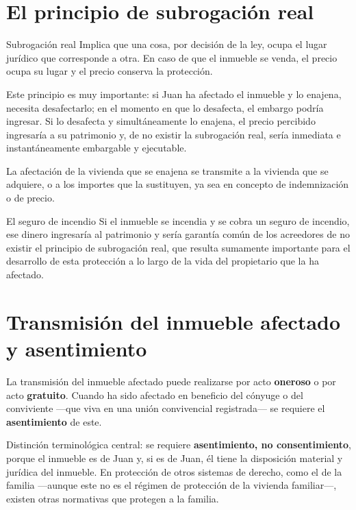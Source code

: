 \documentclass[12pt,oneside]{book}
\begin{document}
\section{El principio de subrogaci\'on real}

\begin{definition}{Subrogaci\'on real}
Implica que una cosa, por decisi\'on de la ley, ocupa el lugar jur\'idico que corresponde a otra. En caso de que el inmueble se venda, el precio ocupa su lugar y el precio conserva la protecci\'on.
\end{definition}

Este principio es muy importante: si Juan ha afectado el inmueble y lo enajena, necesita desafectarlo; en el momento en que lo desafecta, el embargo podr\'ia ingresar. Si lo desafecta y simult\'aneamente lo enajena, el precio percibido ingresar\'ia a su patrimonio y, de no existir la subrogaci\'on real, ser\'ia inmediata e instant\'aneamente embargable y ejecutable.

\begin{important}
La afectaci\'on de la vivienda que se enajena se transmite a la vivienda que se adquiere, o a los importes que la sustituyen, ya sea en concepto de indemnizaci\'on o de precio.
\end{important}

\begin{example}{El seguro de incendio}
Si el inmueble se incendia y se cobra un seguro de incendio, ese dinero ingresar\'ia al patrimonio y ser\'ia garant\'ia com\'un de los acreedores de no existir el principio de subrogaci\'on real, que resulta sumamente importante para el desarrollo de esta protecci\'on a lo largo de la vida del propietario que la ha afectado.
\end{example}

\section{Transmisi\'on del inmueble afectado y asentimiento}

La transmisi\'on del inmueble afectado puede realizarse por acto \textbf{oneroso} o por acto \textbf{gratuito}. Cuando ha sido afectado en beneficio del c\'onyuge o del conviviente ---que viva en una uni\'on convivencial registrada--- se requiere el \textbf{asentimiento} de este.

Distinci\'on terminol\'ogica central: se requiere \textbf{asentimiento, no consentimiento}, porque el inmueble es de Juan y, si es de Juan, \'el tiene la disposici\'on material y jur\'idica del inmueble. En protecci\'on de otros sistemas de derecho, como el de la familia ---aunque este no es el r\'egimen de protecci\'on de la vivienda familiar---, existen otras normativas que protegen a la familia.
\end{document}
